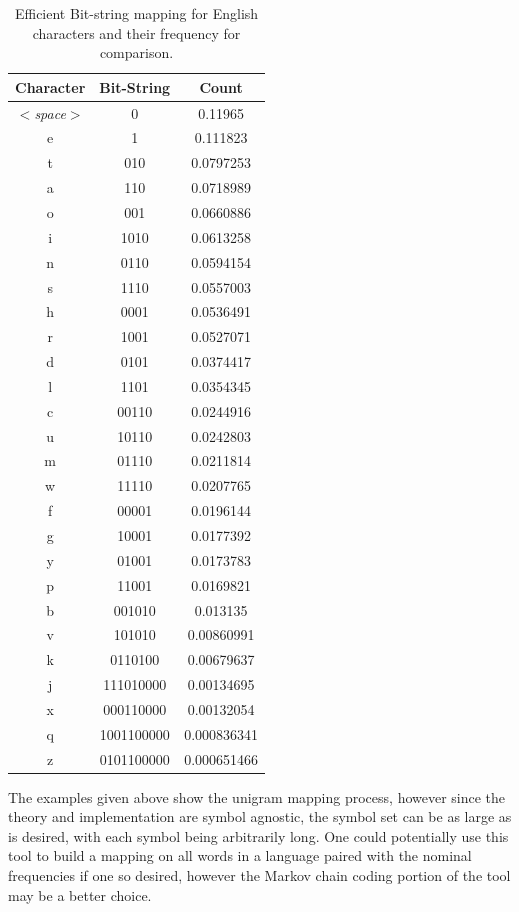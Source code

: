 \documentclass[12pt]{report}
\theoremstyle{remark}
\theoremstyle{definition}
\theoremstyle{definition}
\theoremstyle{definition}
\begin{document}
\begin{appendices}
\begin{table}
\centering
\begin{tabular}{ c | c | c }
Character&Bit-String&Count\\
\hline
$<$\emph{space}$>$&0&0.11965  \\
e&1&0.111823 \\
t&010&0.0797253\\
a&110&0.0718989\\
o&001&0.0660886\\
i&1010&0.0613258\\
n&0110&0.0594154\\
s&1110&0.0557003\\
h&0001&0.0536491\\
r&1001&0.0527071\\
d&0101&0.0374417\\
l&1101&0.0354345\\
c&00110&0.0244916\\
u&10110&0.0242803\\
m&01110&0.0211814\\
w&11110&0.0207765\\
f&00001&0.0196144\\
g&10001&0.0177392\\
y&01001&0.0173783\\
p&11001&0.0169821\\
b&001010&0.013135\\
v&101010&0.00860991\\
k&0110100&0.00679637\\
j&111010000&0.00134695\\
x&000110000&0.00132054\\
q&1001100000&0.000836341\\
z&0101100000&0.000651466\\
\end{tabular}
\caption[English Character Bit-String Mapping - Efficient]{Efficient Bit-string mapping for English characters and their frequency for comparison.}
\label{TABLE_unigrammapping_eff}
\end{table}

The examples given above show the unigram mapping process, however since the
theory and implementation are symbol agnostic, the symbol set can be as large as
is desired, with each symbol being arbitrarily long. One could potentially use
this tool to build a mapping on all words in a language paired with the nominal
frequencies if one so desired, however the Markov chain coding portion of the
tool may be a better choice.


\end{appendices}
\end{document}
